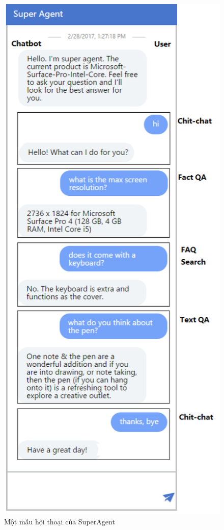 \begin{center}
    \begin{figure}[ht!]
        \begin{center}
         \includegraphics[scale=0.9]{chapter2/img/superagentdialog.png}
        \end{center}
        \caption{Một mẫu hội thoại của SuperAgent}
        \label{fig:superagentdialog}
    \end{figure}
\end{center}

